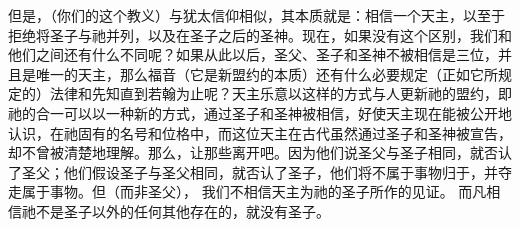 但是，（你们的这个教义）与犹太信仰相似，其本质就是：相信一个天主，以至于拒绝将圣子与祂并列，以及在圣子之后的圣神。现在，如果没有这个区别，我们和他们之间还有什么不同呢？如果从此以后，圣父、圣子和圣神不被相信是三位，并且是唯一的天主，那么福音（它是新盟约的本质）还有什么必要规定（正如它所规定的）法律和先知直到若翰为止呢？天主乐意以这样的方式与人更新祂的盟约，即祂的合一可以以一种新的方式，通过圣子和圣神被相信，好使天主现在能被公开地认识，在祂固有的名号和位格中，而这位天主在古代虽然通过圣子和圣神被宣告，却不曾被清楚地理解。那么，让那些离开吧。因为他们说圣父与圣子相同，就否认了圣父；他们假设圣子与圣父相同，就否认了圣子，他们将不属于事物归于，并夺走属于事物。但（而非圣父）， 我们不相信天主为祂的圣子所作的见证。 而凡相信祂不是圣子以外的任何其他存在的，就没有圣子。\par

